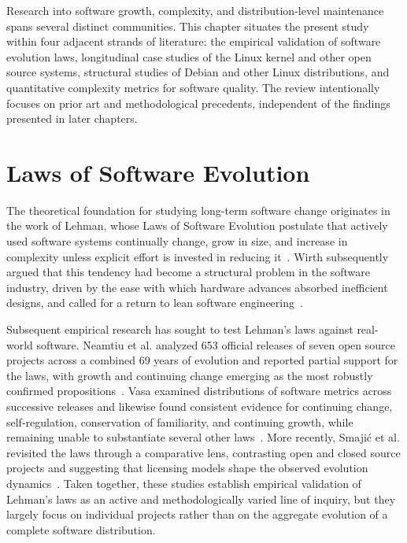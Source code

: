 Research into software growth, complexity, and distribution-level maintenance spans several distinct communities. This chapter situates the present study within four adjacent strands of literature: the empirical validation of software evolution laws, longitudinal case studies of the Linux kernel and other open source systems, structural studies of Debian and other Linux distributions, and quantitative complexity metrics for software quality. The review intentionally focuses on prior art and methodological precedents, independent of the findings presented in later chapters.

\section{Laws of Software Evolution}
\label{sec:rw_evolution}

The theoretical foundation for studying long-term software change originates in the work of Lehman, whose Laws of Software Evolution postulate that actively used software systems continually change, grow in size, and increase in complexity unless explicit effort is invested in reducing it~\cite{Lehman1980Laws}. Wirth subsequently argued that this tendency had become a structural problem in the software industry, driven by the ease with which hardware advances absorbed inefficient designs, and called for a return to lean software engineering~\cite{Wirth1995Plea}.

Subsequent empirical research has sought to test Lehman's laws against real-world software. Neamtiu et al. analyzed 653 official releases of seven open source projects across a combined 69 years of evolution and reported partial support for the laws, with growth and continuing change emerging as the most robustly confirmed propositions~\cite{neamtiu2009towards}. Vasa examined distributions of software metrics across successive releases and likewise found consistent evidence for continuing change, self-regulation, conservation of familiarity, and continuing growth, while remaining unable to substantiate several other laws~\cite{vasa2010growth}. More recently, Smajić et al. revisited the laws through a comparative lens, contrasting open and closed source projects and suggesting that licensing models shape the observed evolution dynamics~\cite{smajic2025evolution}. Taken together, these studies establish empirical validation of Lehman's laws as an active and methodologically varied line of inquiry, but they largely focus on individual projects rather than on the aggregate evolution of a complete software distribution.

